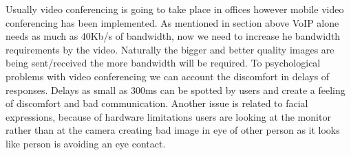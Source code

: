 Usually video conferencing is going to take place in offices however mobile video conferencing has been implemented. As mentioned in section above VoIP alone needs as much as 40Kb/s of bandwidth, now we need to increase he bandwidth requirements by the video. Naturally the bigger and better quality images are being sent/received the more bandwidth will be required.
To psychological problems with video conferencing we can account the discomfort in delays of responses. Delays as small as 300ms can be spotted by users and create a feeling of discomfort and bad communication. Another issue is related to facial expressions, because of hardware limitations users are looking at the monitor rather than at the camera creating bad image in eye of other person as it looks like person is avoiding an eye contact\cite{website:vid_conf_overview}.


